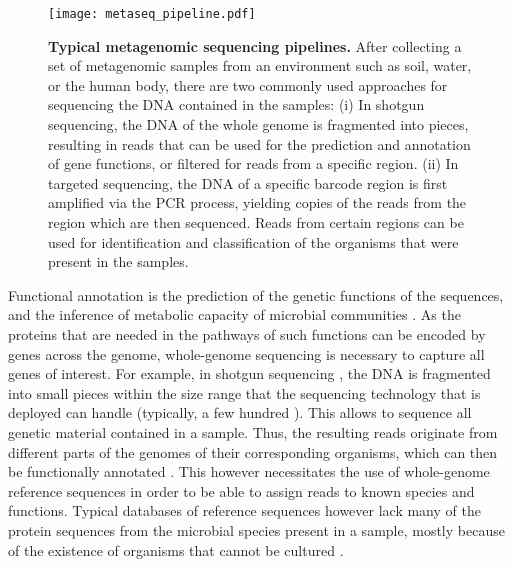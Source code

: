 \begin{figure}[hpbt!]
    \centering
    \texttt{[image: metaseq\_pipeline.pdf]}
    \caption[Typical metagenomic sequencing pipelines]{
        \textbf{Typical metagenomic sequencing pipelines.}
        After collecting a set of metagenomic samples from an environment such as soil, water, or the human body,
        there are two commonly used approaches for sequencing the DNA contained in the samples:
        (i) In shotgun sequencing, the DNA of the whole genome is fragmented into pieces,
        resulting in reads that can be used for the prediction and annotation of gene functions,
        or filtered for reads from a specific region.
        (ii) In targeted sequencing, the DNA of a specific barcode region is first amplified via the PCR process,
        yielding copies of the reads from the region which are then sequenced.
        Reads from certain regions can be used for identification and classification
        of the organisms that were present in the samples.
    }
    \label{fig:metaseq_pipeline}
\end{figure}

Functional annotation \cite{Stein2001} is the prediction of the genetic functions of the sequences,
and the inference of metabolic capacity of microbial communities \cite{Brown2017}.
As the proteins that are needed in the pathways of such functions can be encoded by genes across the genome,
whole-genome sequencing is necessary to capture all genes of interest.
For example, in shotgun sequencing \cite{Staden1979,Anderson1981},
the \ac{DNA} is fragmented into small pieces within the size range that the sequencing technology that is deployed can handle
(typically, a few hundred \si{\basepair}).
This allows to sequence all genetic material contained in a sample.
Thus, the resulting reads originate from different parts of the genomes of their corresponding organisms,
which can then be functionally annotated \cite{Glass2010}.
This however necessitates the use of whole-genome reference sequences
in order to be able to assign reads to known species and functions.
Typical databases of reference sequences however
lack many of the protein sequences from the microbial species present in a sample,
mostly because of the existence of organisms that cannot be cultured \cite{Brown2017}.

